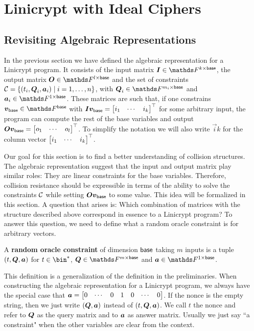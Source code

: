 \chapter{Linicrypt with Ideal Ciphers}

\section{Revisiting Algebraic Representations}
\label{revisiting_algebraic_representations}
In the previous section we have defined the algebraic representation for a Linicrypt program.
It consists of the input matrix $\Inp \in \F^{k \times \base}$,
the output matrix $\O \in \F^{l \times \base}$
and the set of constraints $\mathcal{C} = \{ (t_i, \boldsymbol{Q}_i, \boldsymbol a_i) \mid i = 1, \dots, n \}$,
with $\Q_i \in \F^{m_i \times \base}$ and $\va_i \in \F^{1 \times \base}$.
These matrices are such that,
if one constrains $\vbase \in \Fsp$ with $\boldsymbol{I}\boldsymbol v_{\mathsf{base}} = \begin{bmatrix}i_1 & \cdots & i_k\end{bmatrix}^\top$ for some arbitrary input,
the program can compute the rest of the base variables and output $\boldsymbol{O} \boldsymbol v_{\mathsf{base}} = \begin{bmatrix}o_1 & \cdots & o_l\end{bmatrix}^\top$.
To simplify the notation we will also write $\vec i k$ for the column vector $\begin{bmatrix}i_1 & \cdots & i_k\end{bmatrix}^\top$.

Our goal for this section is to find a better understanding of collision structures.
The algebraic representation suggest
that the input and output matrix play similar roles:
They are linear constraints for the base variables. 
Therefore, collision resistance should be expressible in terms of the ability to solve the constraints $\mathcal{C}$ while setting $\boldsymbol{O}\boldsymbol v_{\mathsf{base}}$ to some value.  
This idea will be formalized in this section.
A question that arises is:
Which combination of matrices with the structure described above correspond in essence to a Linicrypt program?
To answer this question,
we need to define what a random oracle constraint is for arbitrary vectors.

\begin{defn}
A \textbf{random oracle constraint} of dimension $\mathsf{base}$ taking $m$ inputs is a tuple $(t, \boldsymbol Q, \boldsymbol a)$ for
$t \in \bin^*$, $\Q \in \F^{m \times \base}$ and $\va \in \F^{1 \times \base}$.
\end{defn}

This definition is a generalization of the definition in the preliminaries.
When constructing the algebraic representation for a Linicrypt program,
we always have the special case that $\boldsymbol a = \begin{bmatrix}0&\cdots&0&1&0&\cdots&0\end{bmatrix}$.
If the nonce is the empty string, then we just write $(\boldsymbol{Q}, \boldsymbol a)$ instead of $(t, \boldsymbol{Q}, \boldsymbol a)$.
We call $t$ the nonce and refer to $\boldsymbol{Q}$ as the query matrix and to $\boldsymbol a$ as answer matrix.
Usually we just say ``a constraint" when the other variables are clear from the context.

